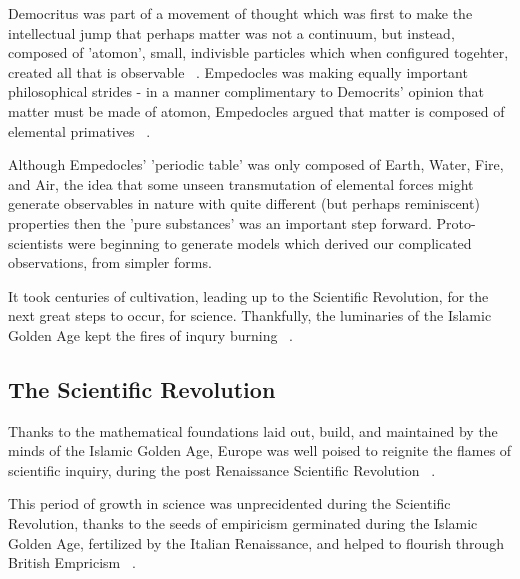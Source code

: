 Democritus was part of a movement of thought which was first to make the
intellectual jump that perhaps matter was not a continuum, but instead, composed
of 'atomon', small, indivisble particles which when configured togehter, created
all that is observable ~\needcite{}. Empedocles was making equally important
philosophical strides - in a manner complimentary to Democrits' opinion that
matter must be made of atomon, Empedocles argued that matter is composed of
elemental primatives ~\needcite{}.

Although Empedocles' 'periodic table' was only composed of Earth, Water, Fire,
and Air, the idea that some unseen transmutation of elemental forces might
generate observables in nature with quite different (but perhaps reminiscent)
properties then the 'pure substances' was an important step forward.
Proto-scientists were beginning to generate models which derived our complicated
observations, from simpler forms.

It took centuries of cultivation, leading up to the Scientific Revolution, for
the next great steps to occur, for science. Thankfully, the luminaries of the
Islamic Golden Age kept the fires of inqury burning ~\needcite{}.

\clearpage
\subsection{The Scientific Revolution}

Thanks to the mathematical foundations laid out, build, and maintained by the
minds of the Islamic Golden Age, Europe was well poised to reignite the flames
of scientific inquiry, during the post Renaissance Scientific Revolution
~\needcite{}.

This period of growth in science was unprecidented during the Scientific
Revolution, thanks to the seeds of empiricism germinated during the Islamic
Golden Age, fertilized by the Italian Renaissance, and helped to flourish
through British Empricism ~\needcite{}.

